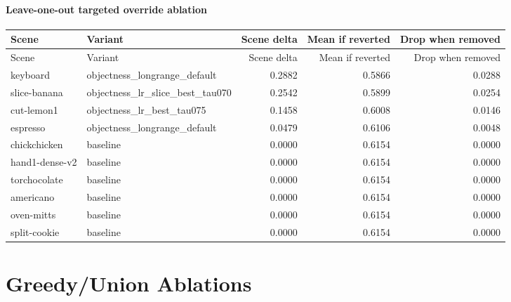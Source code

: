 \documentclass[10pt]{article}
\begin{document}
\paragraph{Leave-one-out targeted override ablation}
\small
\begin{longtable}{llrrr}
\toprule
Scene & Variant & Scene delta & Mean if reverted & Drop when removed \\
\midrule
\endfirsthead
\toprule
Scene & Variant & Scene delta & Mean if reverted & Drop when removed \\
\midrule
\endhead
keyboard & objectness\_longrange\_default & 0.2882 & 0.5866 & 0.0288 \\
slice-banana & objectness\_lr\_slice\_best\_tau070 & 0.2542 & 0.5899 & 0.0254 \\
cut-lemon1 & objectness\_lr\_best\_tau075 & 0.1458 & 0.6008 & 0.0146 \\
espresso & objectness\_longrange\_default & 0.0479 & 0.6106 & 0.0048 \\
chickchicken & baseline & 0.0000 & 0.6154 & 0.0000 \\
hand1-dense-v2 & baseline & 0.0000 & 0.6154 & 0.0000 \\
torchocolate & baseline & 0.0000 & 0.6154 & 0.0000 \\
americano & baseline & 0.0000 & 0.6154 & 0.0000 \\
oven-mitts & baseline & 0.0000 & 0.6154 & 0.0000 \\
split-cookie & baseline & 0.0000 & 0.6154 & 0.0000 \\
\bottomrule
\end{longtable}
\normalsize

\section{Greedy/Union Ablations}
\end{document}
